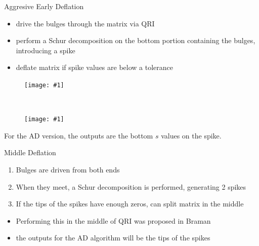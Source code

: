 \documentclass[12pt]{beamer}
\newcommand{\pic}[1]{\texttt{[image: \#1]}}
\begin{document}
  \begin{frame}{Aggresive Early Deflation}
    \begin{itemize}
      \item drive the bulges through the matrix via QRI
      \item perform a Schur decomposition on the bottom portion containing the bulges, introducing a spike
      \item deflate matrix if spike values are below a tolerance
    \end{itemize}

    \begin{figure}[h!]
      \begin{minipage}[t]{.5\linewidth}
        \centering
        \pic{agDef1}
      \end{minipage}~
      \begin{minipage}[t]{.5\linewidth}
        \centering
        \pic{agDef2}
      \end{minipage}
    \end{figure}
    
    For the AD version, the outputs are the bottom $s$ values on the spike.
  \end{frame}

  \begin{frame}{Middle Deflation}
    \begin{enumerate}
      \item Bulges are driven from both ends
      \item When they meet, a Schur decomposition is performed, generating 2 spikes
      \item If the tips of the spikes have enough zeros, can split matrix in the middle
    \end{enumerate}

    \begin{itemize}
      \item Performing this in the middle of QRI was proposed in Braman %
      \item the outputs for the AD algorithm will be the tips of the spikes
    \end{itemize}
  \end{frame}
\end{document}
